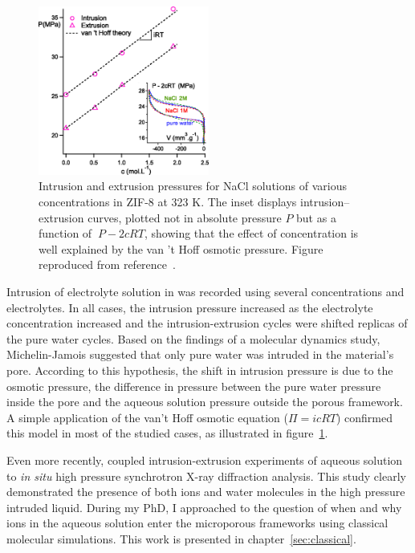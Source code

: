 \documentclass[thesis]{subfiles}
\begin{document}
\begin{figure}[ht]
    \centering
    \includegraphics[width=0.5\textwidth]{figures/cited/osmotic-zif}
    \caption{Intrusion and extrusion pressures for NaCl solutions of
    various concentrations in ZIF-8 at 323 K. The inset displays
    intrusion--extrusion curves, plotted not in absolute pressure $P$ but as a
    function of $\ P - 2cRT$, showing that the effect of concentration is well
    explained by the van 't Hoff osmotic pressure. Figure reproduced from
    reference~\cite{MichelinJamois2015}.}
    \label{fig:osmotic-zif}
\end{figure}

Intrusion of electrolyte solution in  was recorded using several
concentrations and electrolytes\cite{Ortiz2014, MichelinJamois2015}. In all
cases, the intrusion pressure increased as the electrolyte concentration
increased and the intrusion-extrusion cycles were shifted replicas of the pure
water cycles. Based on the findings of a molecular dynamics study\cite{Hu2011},
Michelin-Jamois suggested that only pure water was intruded in the material's
pore. According to this hypothesis, the shift in intrusion pressure is due to
the osmotic pressure, \ie the difference in pressure between the pure water
pressure inside the pore and the aqueous solution pressure outside the porous
framework. A simple application of the van't Hoff osmotic equation ($\Pi = i c R
T$) confirmed this model in most of the studied cases, as illustrated in
figure~\ref{fig:osmotic-zif}.

Even more recently, \citeauthor{Arletti2016}\cite{Arletti2016} coupled
intrusion-extrusion experiments of  aqueous solution to \emph{in situ}
high pressure synchrotron X-ray diffraction analysis. This study clearly
demonstrated the presence of both ions and water molecules in the high pressure
intruded liquid. During my PhD, I approached to the question of when and why
ions in the aqueous solution enter the microporous frameworks using classical
molecular simulations. This work is presented in chapter~\ref{sec:classical}.

\OnlyInSubfile{\printbibliography}
\end{document}

